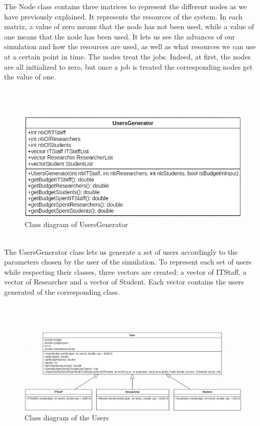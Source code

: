\documentclass [10 pt, a4 paper]{report}
\begin{document}
\noindent
The Node class contains three matrices to represent the different nodes as we have previously explained. It represents the resources of the system. In each matrix, a value of zero means that the node has not been used, while a value of one means that the node has been used. It lets us see the advances of our simulation and how the resources are used, as well as what resources we can use at a certain point in time. The nodes treat the jobs. Indeed, at first, the nodes are all initialized to zero, but once a job is treated the corresponding nodes get the value of one.

\\ \\

\begin{figure}[!htbp]
\centering
\includegraphics[width=1.2\textwidth]{UsersGenerator.jpg}
\caption{\label{fig:image} Class diagram of UsersGenerator}
\end{figure}
\\
\clearpage
\noindent
The UsersGenerator class lets us generate a set of users accordingly to the parameters chosen by the user of the simulation. To represent each set of users while respecting their classes, three vectors are created: a vector of ITStaff, a vector of Researcher and a vector of Student. Each vector contains the users generated of the corresponding class.

\\ \\

\begin{figure}[!htbp]
\centering
\includegraphics[width=1.3\textwidth]{Users.jpg}
\caption{\label{fig:image} Class diagram of the Users}
\end{figure}
\\
\end{document}
